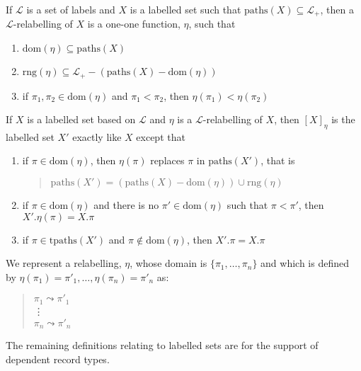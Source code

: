 If $\mathcal{L}$ is a set of labels and $X$ is a labelled set such
that $\mathrm{paths}(X)\subseteq\mathcal{L}_+$, then a
$\mathcal{L}$-relabelling of $X$ is a one-one function, $\eta$, such
that
\begin{enumerate} 
 
\item $\mathrm{dom}(\eta)\subseteq\mathrm{paths}(X)$ 
 
\item
  $\mathrm{rng}(\eta)\subseteq\mathcal{L}_+-(\mathrm{paths}(X)-\mathrm{dom}(\eta))$
  
\item if $\pi_1,\pi_2\in\mathrm{dom}(\eta)$ and $\pi_1<\pi_2$, then $\eta(\pi_1)<\eta(\pi_2)$
 
\end{enumerate} 

If $X$ is a labelled set based on $\mathcal{L}$ and $\eta$ is a
$\mathcal{L}$-relabelling of $X$, then $[X]_\eta$ is the labelled set
$X'$ exactly like $X$ except that
\begin{enumerate} 
 
\item if $\pi\in\mathrm{dom}(\eta)$, then $\eta(\pi)$ replaces $\pi$
  in $\mathrm{paths}(X')$, that is
  \begin{quote}
    $\mathrm{paths}(X')=(\mathrm{paths}(X)-\mathrm{dom}(\eta))\cup\mathrm{rng}(\eta)$
  \end{quote}
  
 
\item if $\pi\in\mathrm{dom}(\eta)$ and there is no
  $\pi'\in\mathrm{dom}(\eta)$ such that $\pi<\pi'$, then
  $X'.\eta(\pi)=X.\pi$
  
\item if $\pi\in\mathrm{tpaths}(X')$ and
  $\pi\not\in\mathrm{dom}(\eta)$, then $X'.\pi=X.\pi$
 
\end{enumerate} 

We represent a relabelling,
$\eta$, whose domain is $\{\pi_1,\ldots,\pi_n\}$ and which is defined
by $\eta(\pi_1)=\pi'_1,\ldots,\eta(\pi_n)=\pi'_n$ as:
\begin{quote}
$\pi_1\leadsto\pi'_1$\\
\vdots\\
$\pi_n\leadsto\pi'_n$
\end{quote}

The remaining definitions relating to labelled sets are for the
support of dependent record types.

